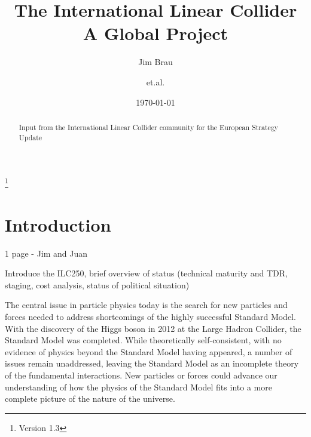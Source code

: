 \documentclass[%
 reprint,
 amsmath,amssymb,
 aps,
]{revtex4-1}
\begin{document}

\title{The International Linear Collider \\ A Global Project}%
\thanks{Version 1.3}%

\author{Jim Brau}
\author{et.al.}%
%


\date{\today}%

\begin{abstract}
Input from the International Linear Collider community for the European Strategy Update 

\end{abstract}

\maketitle


\section{\label{sec:intro}Introduction}

1 page - Jim and Juan

    Introduce the ILC250, brief overview of status (technical maturity and TDR, staging, cost analysis, status of political situation)

The central issue in particle physics today is the search for new particles and 
forces needed to address shortcomings of the highly successful Standard Model.  
With the discovery of the Higgs boson in 2012 at the Large Hadron Collider,
the Standard Model was completed.  
While theoretically self-consistent, with
no evidence of physics beyond the Standard Model having appeared, a number of issues remain
unaddressed, leaving the Standard Model as an incomplete theory of the fundamental
interactions.  New particles or forces could advance our understanding
of how the physics of the Standard Model fits into a more complete
picture of the nature of the universe.
\end{document}
